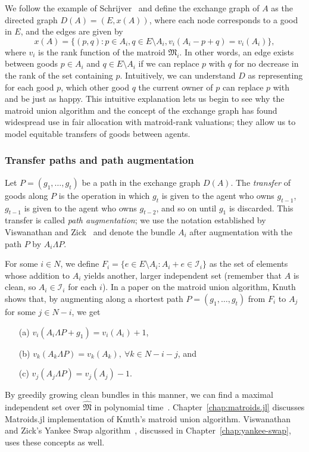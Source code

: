 We follow the example of Schrijver~\cite{schrijver-2003} and define the exchange graph of $A$ as the directed graph $D(A)=(E, x(A))$, where each node corresponds to a good in $E$, and the edges are given by
$$x(A) = \{ (p,q) : p \in A_i, q \in E\setminus A_i, v_i(A_i - p + q) = v_i(A_i) \},$$
where $v_i$ is the rank function of the matroid $\mathfrak{M}_i$. In other words, an edge exists between goods $p\in A_i$ and $q\in E\setminus A_i$ if we can replace $p$ with $q$ for no decrease in the rank of the set containing $p$. Intuitively, we can understand $D$ as representing for each good $p$, which other good $q$ the current owner of $p$ can replace $p$ with and be just as happy. This intuitive explanation lets us begin to see why the matroid union algorithm and the concept of the exchange graph has found widespread use in fair allocation with matroid-rank valuations; they allow us to model equitable transfers of goods between agents.

\subsubsection*{Transfer paths and path augmentation}
Let $P = (g_1, \dots, g_t)$ be a path in the exchange graph $D(A)$. The \textit{transfer} of goods along $P$ is the operation in which $g_t$ is given to the agent who owns $g_{t-1}$, $g_{t-1}$ is given to the agent who owns $g_{t-2}$, and so on until $g_1$ is discarded. This transfer is called \textit{path augmentation}; we use the notation established by Viswanathan and Zick~\cite{viswanathan2023yankee} and denote the bundle $A_i$ after augmentation with the path $P$ by $A_i \Lambda P$. 

For some $i\in N$, we define $F_i = \{ e\in E\setminus A_i : A_i + e \in \mathcal{I}_i \}$ as the set of elements whose addition to $A_i$ yields another, larger independent set (remember that $A$ is clean, so $A_i\in\mathcal{I}_i$ for each $i$). In a paper on the matroid union algorithm, Knuth~\cite{knuth1973matroidpartitioning} shows that, by augmenting along a shortest path $P = (g_1,\dots,g_t)$ from $F_i$ to $A_j$ for some $j \in N - i$, we get
\begin{enumerate}
  \item[(a)] $v_i(A_i\Lambda P + g_1) = v_i(A_i) + 1$,
  \item[(b)] $v_k(A_k\Lambda P) = v_k(A_k),\ \forall k\in N - i - j$, and
  \item[(c)] $v_j(A_j\Lambda P) = v_j(A_j) - 1$.
\end{enumerate}
By greedily growing clean bundles in this manner, we can find a maximal independent set over $\widehat{\mathfrak{M}}$ in polynomial time~\cite{schrijver-2003}. Chapter~\ref{chap:matroids.jl} discusses Matroids.jl implementation of Knuth's matroid union algorithm. Viswanathan and Zick's Yankee Swap algorithm~\cite{viswanathan2023yankee}, discussed in Chapter~\ref{chap:yankee-swap}, uses these concepts as well.

